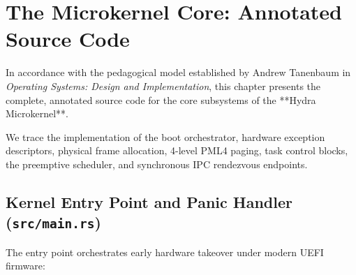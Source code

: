 \chapter{The Microkernel Core: Annotated Source Code}
\label{chap:source_core}

In accordance with the pedagogical model established by Andrew Tanenbaum in \textit{Operating Systems: Design and Implementation}, this chapter presents the complete, annotated source code for the core subsystems of the **Hydra Microkernel**.

We trace the implementation of the boot orchestrator, hardware exception descriptors, physical frame allocation, 4-level PML4 paging, task control blocks, the preemptive scheduler, and synchronous IPC rendezvous endpoints.

\section{Kernel Entry Point and Panic Handler (\texttt{src/main.rs})}
\label{sec:code_main}

The entry point orchestrates early hardware takeover under modern UEFI firmware:

